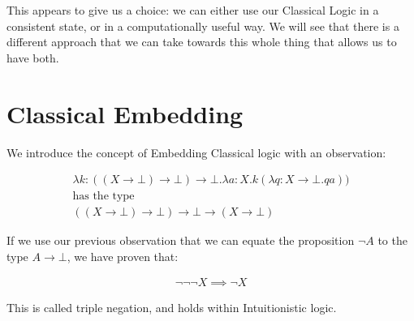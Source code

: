 \documentclass{article}
\newcommand{\inlineeq}[1]{
    \vspace{-2em}
    \begin{gather*}
    #1
    \end{gather*}
    \vspace{-2em}
}
\begin{document}
This appears to give us a choice: we can either use our Classical Logic in a consistent state, or in a computationally useful way. We will see that there is a different approach that we can take towards this whole thing that allows us to have both.

\newpage
\section{Classical Embedding}

We introduce the concept of Embedding Classical logic with an observation: 

\inlineeq{\lambda k : ((X \to \bot) \to \bot) \to \bot . \lambda a: X. k (\lambda q: X \to \bot. q a))\\
\textrm{has the type}\\
((X \to \bot) \to \bot) \to \bot \to (X \to \bot)}

If we use our previous observation that we can equate the proposition $\lnot A$ to the type $A \to \bot$, we have proven that:

\inlineeq{\lnot\lnot\lnot X \implies \lnot X}

This is called triple negation, and holds within Intuitionistic logic.
\end{document}
